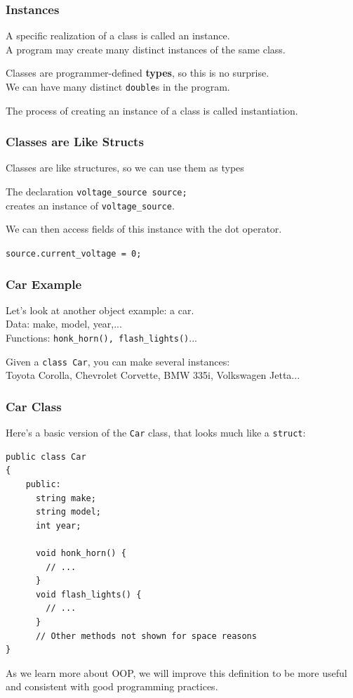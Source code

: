 \begin{frame}
\frametitle{Instances}

A specific realization of a class is called an \alert{instance}.\\
\quad A program may create many distinct instances of the same class.

Classes are programmer-defined \textbf{types}, so this is no surprise.\\
\quad We can have many distinct \texttt{double}s in the program.

The process of creating an instance of a class is called \alert{instantiation}.


\end{frame}

\begin{frame}
\frametitle{Classes are Like Structs}
Classes are like structures, so we can use them as types

The declaration
\quad \texttt{voltage\_source source;}\\

  
creates an instance of \texttt{voltage\_source}.

We can then access fields of this instance with the dot operator.

\texttt{source.current\_voltage = 0;}

\end{frame}

\begin{frame}
\frametitle{Car Example}

Let's look at another object example: a car.\\
\quad Data: make, model, year,...\\
\quad Functions: \texttt{honk\_horn(), flash\_lights()}...


Given a \texttt{class Car}, you can make several instances:\\
\quad Toyota Corolla, Chevrolet Corvette, BMW 335i, Volkswagen Jetta...

\end{frame}


\begin{frame}[fragile]
\frametitle{Car Class}

Here's a basic version of the \texttt{Car} class, that looks much like a \texttt{struct}:

{\scriptsize
\begin{verbatim}
public class Car
{
    public:
      string make;
      string model;
      int year;
    
      void honk_horn() {
        // ...
      }
      void flash_lights() {
        // ...
      }
      // Other methods not shown for space reasons
}
\end{verbatim}
}

As we learn more about OOP, we will improve this definition to be more useful and consistent with good programming practices.

\end{frame}

